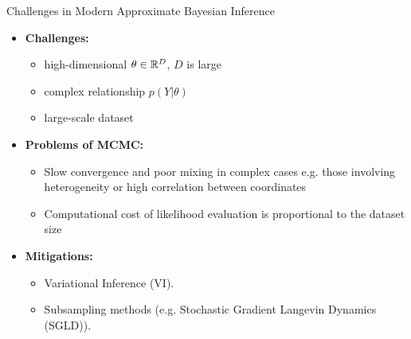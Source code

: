 \documentclass[10pt,xcolor=table]{beamer}
\begin{document}
\begin{frame}{Challenges in Modern Approximate Bayesian Inference}
	\begin{itemize}
		\item \textbf{Challenges:}
		\begin{itemize}
			\item high-dimensional $\theta \in \mathbb{R}^{D}$, $D$ is large
			\item complex relationship $p(Y|\theta)$
			\item large-scale dataset
		\end{itemize}\pause
		\item \textbf{Problems of MCMC:}
		\begin{itemize}
			\item Slow convergence and poor mixing in complex cases e.g. those involving heterogeneity or high correlation between coordinates
			\item Computational cost of likelihood evaluation is proportional to the dataset size
		\end{itemize} \pause
		\item \textbf{Mitigations:}
		\begin{itemize}
			\item Variational Inference (VI).
			\item Subsampling methods (e.g. Stochastic Gradient Langevin Dynamics (SGLD)).
		\end{itemize}
	\end{itemize}
\end{frame}

\end{document}
